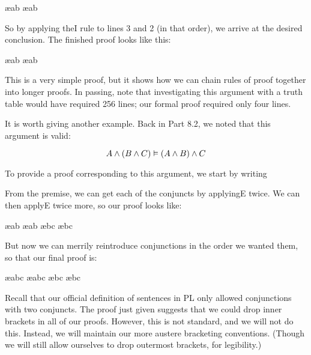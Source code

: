 \begin{fitchproof}
 \ae{ab}
 \ae{ab}
\end{fitchproof}

So by applying the\eand I rule to lines 3 and 2 (in that order), we arrive at the desired conclusion. The finished proof looks like this:
\begin{fitchproof}
 \ae{ab}
 \ae{ab}
 
\end{fitchproof}
This is a very simple proof, but it shows how we can chain rules of proof together into longer proofs. In passing, note that investigating this argument with a truth table would have required 256 lines; our formal proof required only four lines.

It is worth giving another example. Back in Part 8.2, we noted that this argument is valid:

$$A\wedge (B\wedge C) \vDash (A\wedge B)\wedge C$$

To provide a proof corresponding to this argument, we start by writing
\begin{fitchproof}
\end{fitchproof}
From the premise, we can get each of the conjuncts by applying\eand E twice. We can then apply\eand E twice more, so our proof looks like:
\begin{fitchproof}
 \ae{ab}
 \ae{ab}
 \ae{bc}
 \ae{bc}
\end{fitchproof}
But now we can merrily reintroduce conjunctions in the order we wanted them, so that our final proof is:
\begin{fitchproof}
 \ae{abc}
 \ae{abc}
 \ae{bc}
 \ae{bc}
\end{fitchproof}

Recall that our official definition of sentences in PL only allowed conjunctions with two conjuncts. The proof just given suggests that we could drop inner brackets in all of our proofs. However, this is not standard, and we will not do this. Instead, we will maintain our more austere bracketing conventions. (Though we will still allow ourselves to drop outermost brackets, for legibility.)

